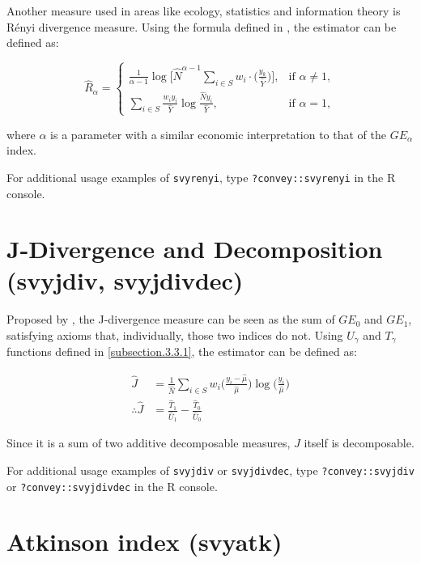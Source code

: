 \documentclass[]{book}
\theoremstyle{definition}
\theoremstyle{definition}
\theoremstyle{remark}
\begin{document}
Another measure used in areas like ecology, statistics and information
theory is Rényi divergence measure. Using the formula defined in
\citep{langel2012}, the estimator can be defined as:

\[
\widehat{R}_\alpha =
\begin{cases}
\frac{1}{\alpha - 1} \log \bigg[ \widehat{N}^{\alpha - 1} \sum_{i \in S} w_i \cdot \bigg( \frac{y_k}{ \widehat{Y} } \bigg) \bigg], &\text{if } \alpha \neq 1, \\
\sum_{i \in S} \frac{w_i y_i}{ \widehat{Y}} \log \frac{\widehat{N} y_i}{\widehat{Y}}, &\text{if } \alpha = 1,
\end{cases}
\]

where \(\alpha\) is a parameter with a similar economic interpretation
to that of the \(GE_\alpha\) index.

For additional usage examples of \texttt{svyrenyi}, type
\texttt{?convey::svyrenyi} in the R console.

\section{J-Divergence and Decomposition (svyjdiv,
svyjdivdec)}\label{j-divergence-and-decomposition-svyjdiv-svyjdivdec}

Proposed by \citep{rohde2016}, the J-divergence measure can be seen as
the sum of \(GE_0\) and \(GE_1\), satisfying axioms that, individually,
those two indices do not. Using \(U_\gamma\) and \(T_\gamma\) functions
defined in \ref{subsection.3.3.1}, the estimator can be defined as:

\[
\begin{aligned}
\widehat{J} &= \frac{1}{\widehat{N}} \sum_{i \in S} w_i \bigg( \frac{ y_i - \widehat{\mu} }{ \widehat{\mu} } \bigg) \log \bigg( \frac{y_i}{\widehat{\mu}} \bigg) \\
\therefore \widehat{J} &= \frac{\widehat{T}_1}{\widehat{U}_1} - \frac{ \widehat{T}_0 }{ \widehat{U}_0 }
\end{aligned}
\]

Since it is a sum of two additive decomposable measures, \(J\) itself is
decomposable.

For additional usage examples of \texttt{svyjdiv} or
\texttt{svyjdivdec}, type \texttt{?convey::svyjdiv} or
\texttt{?convey::svyjdivdec} in the R console.

\section{Atkinson index (svyatk)}\label{atkinson-index-svyatk}
\end{document}
